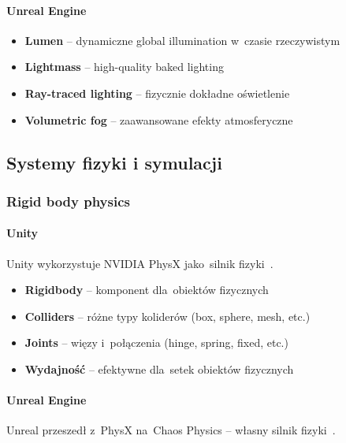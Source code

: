 \paragraph{Unreal Engine}
\begin{itemize}
    \item \textbf{Lumen} -- dynamiczne global illumination w~czasie rzeczywistym~\cite{unreal_lumen}
    \item \textbf{Lightmass} -- high-quality baked lighting~\cite{gregory2018game}
    \item \textbf{Ray-traced lighting} -- fizycznie dokładne oświetlenie~\cite{parker2010optix}
    \item \textbf{Volumetric fog} -- zaawansowane efekty atmosferyczne~\cite{unreal_lumen}
\end{itemize}

\subsection{Systemy fizyki i symulacji}

\subsubsection{Rigid body physics}

\paragraph{Unity}
Unity wykorzystuje NVIDIA PhysX jako~silnik fizyki~\cite{nvidia_physx, unity_physics}.

\begin{itemize}
    \item \textbf{Rigidbody} -- komponent dla~obiektów fizycznych~\cite{unity_physics}
    \item \textbf{Colliders} -- różne typy koliderów (box, sphere, mesh, etc.)~\cite{unity_physics}
    \item \textbf{Joints} -- więzy i~połączenia (hinge, spring, fixed, etc.)~\cite{nvidia_physx}
    \item \textbf{Wydajność} -- efektywne dla~setek obiektów fizycznych~\cite{messaoudi2017performance}
\end{itemize}

\paragraph{Unreal Engine}
Unreal przeszedł z~PhysX na~Chaos Physics -- własny silnik fizyki~\cite{unreal_chaos}.


